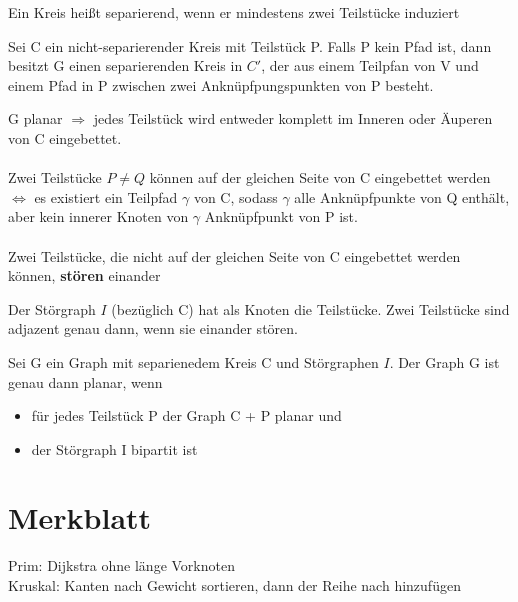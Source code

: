 \documentclass[14pt]{article}
\begin{document}
\begin{definition}
    Ein Kreis heißt separierend, wenn er mindestens zwei
    Teilstücke induziert
\end{definition}
\begin{eigenschaft}
    Sei C ein nicht-separierender Kreis mit Teilstück P.
    Falls P kein Pfad ist, dann besitzt G einen separierenden Kreis
    in $C'$, der aus einem Teilpfan von V und einem Pfad in P 
    zwischen zwei Anknüpfpungspunkten von P besteht.
\end{eigenschaft}
\begin{definition}
    G planar $\Rightarrow$ jedes Teilstück wird entweder komplett im Inneren oder
    Äuperen von C eingebettet. \\
    \\
    Zwei Teilstücke $P \neq Q$ können auf der gleichen Seite von C 
    eingebettet werden $\Leftrightarrow$ es existiert ein Teilpfad $\gamma$ von C,
    sodass $\gamma$ alle Anknüpfpunkte von Q enthält, aber kein innerer 
    Knoten von $\gamma$ Anknüpfpunkt von P ist. \\
    \\
    Zwei Teilstücke, die nicht auf der gleichen Seite von C
    eingebettet werden können, \textbf{stören} einander
\end{definition}
\begin{definition}[Störgraph]
    Der Störgraph $I$ (bezüglich C) hat als Knoten die Teilstücke.
    Zwei Teilstücke sind adjazent genau dann, wenn sie einander stören.
\end{definition}
\begin{eigenschaft}
    Sei G ein Graph mit separienedem Kreis C und Störgraphen $I$.
    Der Graph G ist genau dann planar, wenn
    \begin{itemize}
        \item für jedes Teilstück P der Graph C + P planar und
        \item der Störgraph I bipartit ist
    \end{itemize}
\end{eigenschaft}
\section{Merkblatt}
Prim: Dijkstra ohne länge Vorknoten \\
Kruskal: Kanten nach Gewicht sortieren, dann der Reihe
nach hinzufügen 
\end{document}
